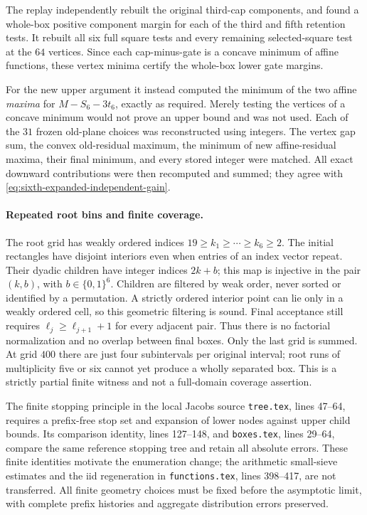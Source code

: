 The replay independently rebuilt the original third-cap components,
and found a whole-box positive component margin for each of the third
and fifth retention tests. It rebuilt all six full square tests and
every remaining selected-square test at the $64$ vertices. Since
each cap-minus-gate is a concave minimum of affine functions, these
vertex minima certify the whole-box lower gate margins.

For the new upper argument it instead computed the minimum of the
two affine \emph{maxima} for $M-S_6-3t_6$, exactly as required.
Merely testing the vertices of a concave minimum would not prove an
upper bound and was not used. Each of the $31$ frozen old-plane
choices was reconstructed using integers. The vertex gap sum, the
convex old-residual maximum, the minimum of new affine-residual
maxima, their final minimum, and every stored integer were matched.
All exact downward contributions were then recomputed and summed;
they agree with \eqref{eq:sixth-expanded-independent-gain}.


\paragraph{Repeated root bins and finite coverage.}
The root grid has weakly ordered indices $19\ge k_1\ge\cdots\ge k_6\ge2$.
The initial rectangles have disjoint interiors even when entries of an index
vector repeat.  Their dyadic children have integer indices $2k+b$;
this map is injective in the pair $(k,b)$, with $b\in\{0,1\}^6$.
Children are filtered by weak order, never sorted or identified by a
permutation. A strictly ordered interior point can lie only in a weakly
ordered cell, so this geometric filtering is sound.  Final acceptance
still requires $\ell_j\ge\ell_{j+1}+1$ for every adjacent pair.
Thus there is no factorial normalization and no overlap between final
boxes.  Only the last grid is summed. At grid $400$ there are just four
subintervals per original interval; root runs of multiplicity five or six
cannot yet produce a wholly separated box. This is a strictly partial
finite witness and not a full-domain coverage assertion.

The finite stopping principle in the local Jacobs source
\texttt{tree.tex}, lines 47--64, requires a prefix-free stop set and
expansion of lower nodes against upper child bounds.  Its comparison
identity, lines 127--148, and \texttt{boxes.tex}, lines 29--64,
compare the same reference stopping tree and retain all absolute errors.
These finite identities motivate the enumeration change; the arithmetic
small-sieve estimates and the iid regeneration in \texttt{functions.tex},
lines 398--417, are not transferred.  All finite geometry choices must be
fixed before the asymptotic limit, with complete prefix histories and
aggregate distribution errors preserved.

